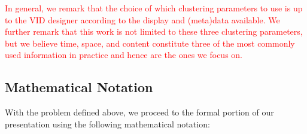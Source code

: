 \textcolor{red}{ In general, we remark that the choice of which clustering parameters to use is up to the VID designer according to the display and (meta)data available.  We further remark that this work is not limited to these three clustering parameters, but we believe time, space, and content constitute three of the most commonly used information in practice and hence are the ones we focus on.}

\subsection{Mathematical Notation}

With the problem defined above, we proceed to the formal portion of our presentation using  
the following mathematical notation:

